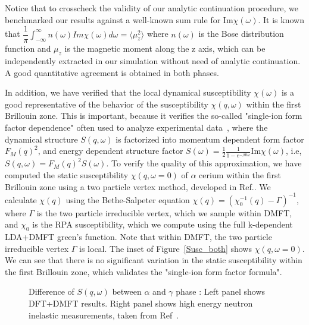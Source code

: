 \documentclass[10pt]{ruthesis}
\begin{document}
{Notice that to crosscheck the validity of our analytic continuation
procedure, we benchmarked our results against a well-known sum rule
for Im$\chi(\omega)$. It is known that
$\dfrac{1}{\pi}\int_{-\infty}^{\infty} n(\omega)Im\chi(\omega) d\omega
= \langle \mu_{z}^{2} \rangle$ where $n(\omega)$ is the Bose
distribution function and $\mu_{z}$ is the magnetic moment along the z
axis, which can be independently extracted in our simulation without
need of analytic continuation.  A good quantitative agreement is
obtained in both phases.




In addition, we have verified that the local dynamical susceptibility
$\chi(\omega)$ is a good representative of the behavior of the
susceptibility $\chi(q,\omega)$ within the first Brillouin zone.  This
is important, because it verifies the so-called "single-ion form
factor dependence" often used to analyze experimental
data~\cite{murani}, where the dynamical structure $S(q,\omega)$ is
factorized into momentum dependent form factor $F_M(q)^2$, and
energy dependent structure factor
$S(\omega)=\frac{1}{2}\frac{1}{1-e^{-\beta\hbar\omega}}$Im$\chi(\omega)$,
i.e, $S(q,\omega) = F_M(q)^2 S(\omega)$.  To verify the quality of
this approximation, we have computed the static susceptibility
$\chi(q, \omega=0)$ of $\alpha$ cerium within the first Brillouin zone
using a two particle vertex method, developed in
Ref.\cite{Park_prl11}.  We calculate $\chi(q)$ using the
Bethe-Salpeter equation $\chi(q)= (\chi_{0}^{-1}(q)-\Gamma)^{-1}$,
where $\Gamma$ is the two particle irreducible vertex, which we sample
within DMFT, and $\chi_0$ is the RPA susceptibility, which we compute
using the full k-dependent LDA+DMFT green's function. Note that within
DMFT, the two particle irreducible vertex $\Gamma$ is local. The inset
of Figure~\ref{Susc_both} shows $\chi(q, \omega=0)$. We can see that
there is no significant variation in the static susceptibility within
the first Brillouin zone, which validates the "single-ion form factor
formula".





\begin{figure}[t]
\caption{Difference of $S(q,\omega)$ between $\alpha$ and $\gamma$ phase :
  Left panel shows DFT+DMFT  results. Right panel shows high energy neutron
  inelastic measurements, taken from Ref~\cite{murani}.
  }
\label{Sq}
\end{figure}

}
\end{document}
